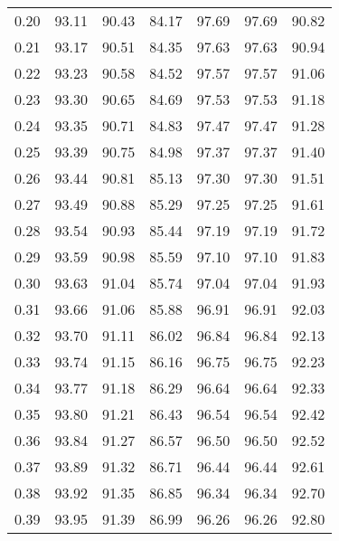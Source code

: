 \begin{tabular}{|c|c|c|c|c|c|c|}
      0.20 &     93.11 &     90.43 &      84.17 &   97.69 &      97.69 &         90.82 \\
      0.21 &     93.17 &     90.51 &      84.35 &   97.63 &      97.63 &         90.94 \\
      0.22 &     93.23 &     90.58 &      84.52 &   97.57 &      97.57 &         91.06 \\
      0.23 &     93.30 &     90.65 &      84.69 &   97.53 &      97.53 &         91.18 \\
      0.24 &     93.35 &     90.71 &      84.83 &   97.47 &      97.47 &         91.28 \\
      0.25 &     93.39 &     90.75 &      84.98 &   97.37 &      97.37 &         91.40 \\
      0.26 &     93.44 &     90.81 &      85.13 &   97.30 &      97.30 &         91.51 \\
      0.27 &     93.49 &     90.88 &      85.29 &   97.25 &      97.25 &         91.61 \\
      0.28 &     93.54 &     90.93 &      85.44 &   97.19 &      97.19 &         91.72 \\
      0.29 &     93.59 &     90.98 &      85.59 &   97.10 &      97.10 &         91.83 \\
      0.30 &     93.63 &     91.04 &      85.74 &   97.04 &      97.04 &         91.93 \\
      0.31 &     93.66 &     91.06 &      85.88 &   96.91 &      96.91 &         92.03 \\
      0.32 &     93.70 &     91.11 &      86.02 &   96.84 &      96.84 &         92.13 \\
      0.33 &     93.74 &     91.15 &      86.16 &   96.75 &      96.75 &         92.23 \\
      0.34 &     93.77 &     91.18 &      86.29 &   96.64 &      96.64 &         92.33 \\
      0.35 &     93.80 &     91.21 &      86.43 &   96.54 &      96.54 &         92.42 \\
      0.36 &     93.84 &     91.27 &      86.57 &   96.50 &      96.50 &         92.52 \\
      0.37 &     93.89 &     91.32 &      86.71 &   96.44 &      96.44 &         92.61 \\
      0.38 &     93.92 &     91.35 &      86.85 &   96.34 &      96.34 &         92.70 \\
      0.39 &     93.95 &     91.39 &      86.99 &   96.26 &      96.26 &         92.80 \\

\end{tabular}
